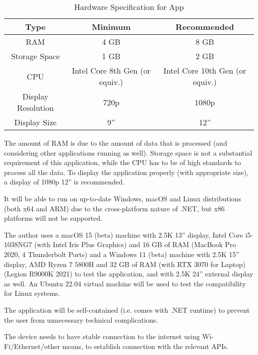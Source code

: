 \begin{table}[htp]
    \centering

    \begin{tabular}{|c|c|c|}
        \hline
        Type               & Minimum                        & Recommended                     \\
        \hline
        RAM                & 4 GB                           & 8 GB                            \\
        Storage Space      & 1 GB                           & 2 GB                            \\
        CPU                & Intel Core 8th Gen (or equiv.) & Intel Core 10th Gen (or equiv.) \\
        Display Resolution & 720p                           & 1080p                           \\
        Display Size       & 9''                            & 12''                            \\
        \hline
    \end{tabular}
    \caption{Hardware Specification for App}
    \label{tab:hardware-spec}
\end{table}

The amount of RAM is due to the amount of data that is processed (and considering other applications running as well). Storage space is not a substantial requirement of this application, while the CPU has to be of high standards to process all the data. To display the application properly (with appropriate size), a display of 1080p 12'' is recommended.

It will be able to run on up-to-date Windows, macOS and Linux distributions (both x64 and ARM) due to the cross-platform nature of .NET, but x86 platforms will not be supported.

The author uses a macOS 15 (beta) machine with 2.5K 13'' display, Intel Core i5-1038NG7 (with Intel Iris Plus Graphics) and 16 GB of RAM (MacBook Pro 2020, 4 Thunderbolt Ports) and a Windows 11 (beta) machine with 2.5K 15'' display, AMD Ryzen 7 5800H and 32 GB of RAM (with RTX 3070 for Laptop) (Legion R9000K 2021) to test the application, and with 2.5K 24'' external display as well. An Ubuntu 22.04 virtual machine will be used to test the compatibility for Linux systems.

The application will be self-contained (i.e. comes with .NET runtime) to prevent the user from unnecessary technical complications.

The device needs to have stable connection to the internet using Wi-Fi/Ethernet/other means, to establish connection with the relevant APIs.